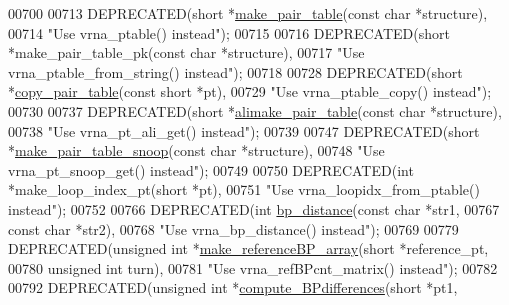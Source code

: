 \begin{DoxyCode}
00700 
00713 DEPRECATED(\textcolor{keywordtype}{short} *\hyperlink{group__struct__utils__deprecated_ga89c32307ee50a0026f4a3131fac0845a}{make\_pair\_table}(\textcolor{keyword}{const} \textcolor{keywordtype}{char} *structure),
00714            \textcolor{stringliteral}{"Use vrna\_ptable() instead"});
00715 
00716 DEPRECATED(\textcolor{keywordtype}{short} *make\_pair\_table\_pk(\textcolor{keyword}{const} \textcolor{keywordtype}{char} *structure),
00717            \textcolor{stringliteral}{"Use vrna\_ptable\_from\_string() instead"});
00718 
00728 DEPRECATED(\textcolor{keywordtype}{short} *\hyperlink{group__struct__utils__deprecated_gafeaa6d68eef3a99d0a7aa08aa91c6601}{copy\_pair\_table}(\textcolor{keyword}{const} \textcolor{keywordtype}{short} *pt),
00729            \textcolor{stringliteral}{"Use vrna\_ptable\_copy() instead"});
00730 
00737 DEPRECATED(\textcolor{keywordtype}{short} *\hyperlink{group__struct__utils__deprecated_ga3c81b3967056c3888b8472b65fbb16f5}{alimake\_pair\_table}(\textcolor{keyword}{const} \textcolor{keywordtype}{char} *structure),
00738            \textcolor{stringliteral}{"Use vrna\_pt\_ali\_get() instead"});
00739 
00747 DEPRECATED(\textcolor{keywordtype}{short} *\hyperlink{group__struct__utils__deprecated_ga9aa3bf3b4346bb7fb88efc154dd07a79}{make\_pair\_table\_snoop}(\textcolor{keyword}{const} \textcolor{keywordtype}{char} *structure),
00748            \textcolor{stringliteral}{"Use vrna\_pt\_snoop\_get() instead"});
00749 
00750 DEPRECATED(\textcolor{keywordtype}{int} *make\_loop\_index\_pt(\textcolor{keywordtype}{short} *pt),
00751            \textcolor{stringliteral}{"Use vrna\_loopidx\_from\_ptable() instead"});
00752 
00766 DEPRECATED(\textcolor{keywordtype}{int} \hyperlink{group__struct__utils__deprecated_ga6ebbcd29a754f0e4f1a66d1fd84184db}{bp\_distance}(\textcolor{keyword}{const} \textcolor{keywordtype}{char} *str1,
00767                            \textcolor{keyword}{const} \textcolor{keywordtype}{char} *str2),
00768            \textcolor{stringliteral}{"Use vrna\_bp\_distance() instead"});
00769 
00779 DEPRECATED(\textcolor{keywordtype}{unsigned} \textcolor{keywordtype}{int} *\hyperlink{group__struct__utils__deprecated_ga578cd9712dee812fb1c58aa3cc489864}{make\_referenceBP\_array}(\textcolor{keywordtype}{short}         *reference\_pt,
00780                                                 \textcolor{keywordtype}{unsigned} \textcolor{keywordtype}{int}  turn),
00781            \textcolor{stringliteral}{"Use vrna\_refBPcnt\_matrix() instead"});
00782 
00792 DEPRECATED(\textcolor{keywordtype}{unsigned} \textcolor{keywordtype}{int} *\hyperlink{group__struct__utils__deprecated_gadd463184355d0803b6ee6e09f29182f2}{compute\_BPdifferences}(\textcolor{keywordtype}{short}        *pt1,

\end{DoxyCode}
